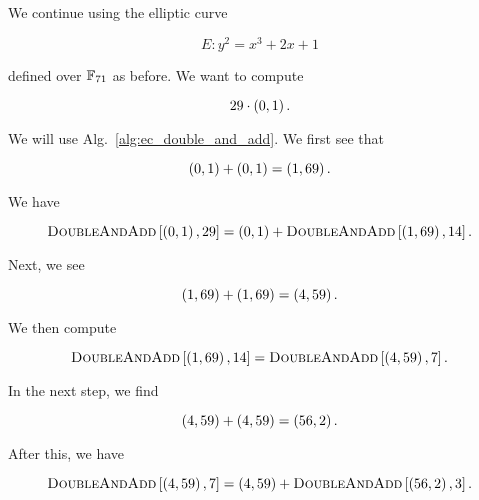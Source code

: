 \begin{example}
\label{example:ec_double-and-add}

We continue using the \gls{elliptic curve}

\begin{equation}
    E: y^{2} = x^{3} + 2x + 1
\end{equation}

\noindent
defined over $\mathbb{F}_{71}$ as before.
We want to compute

\begin{equation}
    29\cdot\left( 0,1 \right).
\end{equation}

We will use Alg.~\ref{alg:ec_double_and_add}.
We first see that

\begin{equation}
    \left( 0,1 \right) + \left( 0,1 \right) = \left( 1,69 \right).
\end{equation}

\noindent
We have

\begin{equation}
    \textsc{DoubleAndAdd}\left[ \left( 0,1 \right), 29 \right]
    = \left( 0,1 \right) + \textsc{DoubleAndAdd}\left[ \left( 1,69 \right), 14 \right].
\end{equation}

\noindent
Next, we see

\begin{equation}
    \left( 1,69 \right) + \left( 1,69 \right) = \left( 4,59 \right).
\end{equation}

\noindent
We then compute

\begin{equation}
    \textsc{DoubleAndAdd}\left[ \left( 1,69 \right), 14 \right]
    = \textsc{DoubleAndAdd}\left[ \left( 4,59 \right), 7 \right].
\end{equation}

\noindent
In the next step, we find

\begin{equation}
    \left( 4,59 \right) + \left( 4,59 \right) = \left( 56,2 \right).
\end{equation}

\noindent
After this, we have

\begin{equation}
    \textsc{DoubleAndAdd}\left[ \left( 4,59 \right), 7 \right]
    = \left( 4,59 \right) + \textsc{DoubleAndAdd}\left[ \left( 56,2 \right), 3 \right].
\end{equation}


\end{example}
